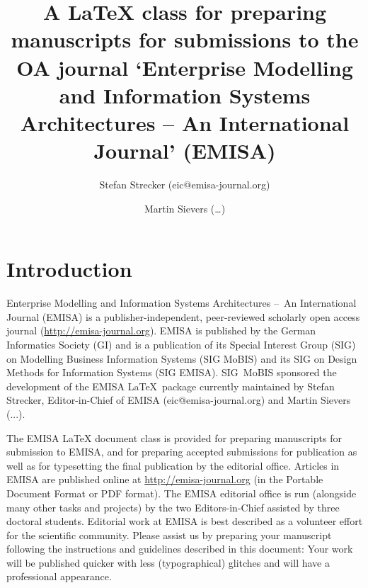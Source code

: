 \documentclass[a4paper]{ltxdoc}
\providecommand*\pkg[1]{\textsf{#1}}
\begin{document}
\author{Stefan Strecker (eic@emisa-journal.org) \and Martin Sievers (\ldots)}
\title{A \LaTeX{} class for preparing manuscripts for submissions to the OA  journal ‘Enterprise Modelling and Information Systems Architectures – An International Journal’ (EMISA)}
\maketitle




\section{Introduction}
Enterprise Modelling and Information Systems Architectures --~An International Journal (EMISA) is a publisher-independent, peer-reviewed scholarly open access journal (\url{http://emisa-journal.org}). 
EMISA is published by the German Informatics Society (GI) and is a publication of its Special Interest Group (SIG) on Modelling Business Information Systems (SIG MoBIS) and its SIG on Design Methods for Information Systems (SIG EMISA). SIG~MoBIS sponsored the development of the \pkg{EMISA} \LaTeX\ package currently maintained by Stefan Strecker, Editor-in-Chief of EMISA (eic@emisa-journal.org) and Martin Sievers (...).

The EMISA \LaTeX{} document class is provided for preparing manuscripts for submission to EMISA, and for preparing accepted submissions for publication as well as for typesetting the final publication by the editorial office. Articles in EMISA are published online at \url{http://emisa-journal.org} (in the Portable Document Format or PDF format).
The EMISA editorial office is run (alongside many other tasks and projects) by the two Editors-in-Chief assisted by three doctoral students. Editorial work at EMISA is best described as a volunteer effort for the scientific community.
Please assist us by preparing your manuscript following the instructions and guidelines described in this document: Your work will be published quicker with less (typographical) glitches and will have a professional appearance.
\end{document}
